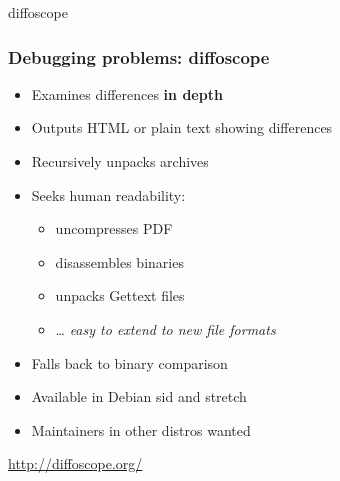 \documentclass[14pt]{beamer}
\begin{document}
{
\begin{frame}{diffoscope}
 \frametitle{Debugging problems: diffoscope}

 \begin{itemize}
  \item Examines differences \textbf{in depth}
  \item Outputs HTML or plain text showing differences
  \item Recursively unpacks archives
  \item Seeks human readability:
   \begin{itemize}
    \item uncompresses PDF
    \item disassembles binaries
    \item unpacks Gettext files
    \item … \textit{easy to extend to new file formats}
   \end{itemize}
  \item Falls back to binary comparison
  \item Available in Debian sid and stretch
  \item Maintainers in other distros wanted
 \end{itemize}
 \vfill
 \begin{center}
  \url{http://diffoscope.org/}\\
  {\footnotesize {}}
 \end{center}
\end{frame}
}
\end{document}
